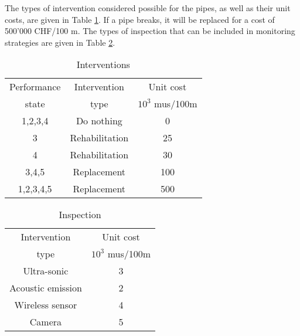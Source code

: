 The types of intervention considered possible for the pipes, as well as their
unit costs, are given in Table \ref{tbl-reliability-a:9}. If a pipe breaks, it will be replaced
for a cost of 500'000 CHF/100 m. The types of inspection that can be included in
monitoring strategies are given in Table \ref{tbl-reliability-a:10}.

\begin{table}[h]
\caption{Interventions}
\begin{tabular}{|l|l|l|}
\hline
\multicolumn{1}{|c|}{Performance} & \multicolumn{1}{c|}{Intervention} & \multicolumn{1}{c|}{Unit cost} \\ 
\multicolumn{1}{|c|}{state} & \multicolumn{1}{c|}{type} & \multicolumn{1}{c|}{$10^3$ mus/100m} \\ 
\hline
\multicolumn{1}{|c|}{1,2,3,4} & \multicolumn{1}{c|}{Do nothing} & \multicolumn{1}{c|}{0} \\ 
\hline
\multicolumn{1}{|c|}{3} & \multicolumn{1}{c|}{Rehabilitation} & \multicolumn{1}{c|}{25} \\ 
\hline
\multicolumn{1}{|c|}{4} & \multicolumn{1}{c|}{Rehabilitation} & \multicolumn{1}{c|}{30} \\ 
\hline
\multicolumn{1}{|c|}{3,4,5} & \multicolumn{1}{c|}{Replacement} & \multicolumn{1}{c|}{100} \\ 
\hline
\multicolumn{1}{|c|}{1,2,3,4,5} & \multicolumn{1}{c|}{Replacement} & \multicolumn{1}{c|}{500} \\ 
\hline
\end{tabular}
\label{tbl-reliability-a:9}
\end{table}

\begin{table}[h]
\caption{Inspection}
\begin{tabular}{|l|l|}
\hline
\multicolumn{1}{|c|}{Intervention} & \multicolumn{1}{c|}{Unit cost} \\ 
\multicolumn{1}{|c|}{type} & \multicolumn{1}{c|}{$10^3$ mus/100m} \\ 
\hline
\multicolumn{1}{|c|}{Ultra-sonic} & \multicolumn{1}{c|}{3} \\ 
\hline
\multicolumn{1}{|c|}{Acoustic emission} & \multicolumn{1}{c|}{2} \\ 
\hline
\multicolumn{1}{|c|}{Wireless sensor} & \multicolumn{1}{c|}{4} \\ 
\hline
\multicolumn{1}{|c|}{Camera} & \multicolumn{1}{c|}{5} \\ 
\hline
\end{tabular}
\label{tbl-reliability-a:10}
\end{table}
